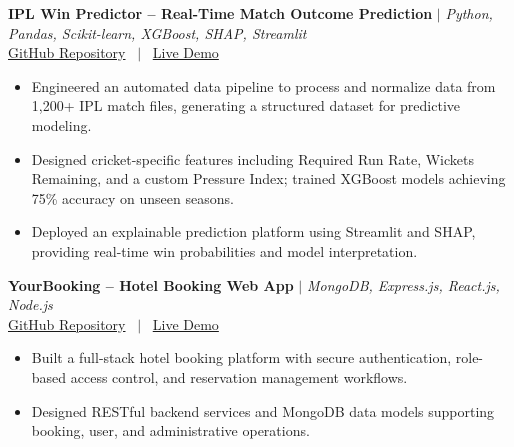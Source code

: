 \documentclass[10pt, a4paper]{article}
\begin{document}
\textbf{IPL Win Predictor -- Real-Time Match Outcome Prediction} $|$ \textit{Python, Pandas, Scikit-learn, XGBoost, SHAP, Streamlit} \\

\small{
\href{https://github.com}{GitHub Repository}
 \ $|$ \ \href{https://demo.example.com}{Live Demo}
} \\

\begin{itemize}

    \item Engineered an automated data pipeline to process and normalize data from 1,200+ IPL match files, generating a structured dataset for predictive modeling.

    \item Designed cricket-specific features including Required Run Rate, Wickets Remaining, and a custom Pressure Index; trained XGBoost models achieving 75\% accuracy on unseen seasons.

    \item Deployed an explainable prediction platform using Streamlit and SHAP, providing real-time win probabilities and model interpretation.

\end{itemize}
\vspace{2pt}

\textbf{YourBooking -- Hotel Booking Web App} $|$ \textit{MongoDB, Express.js, React.js, Node.js} \\

\small{
\href{https://github.com}{GitHub Repository}
 \ $|$ \ \href{https://demo.example.com}{Live Demo}
} \\

\begin{itemize}

    \item Built a full-stack hotel booking platform with secure authentication, role-based access control, and reservation management workflows.

    \item Designed RESTful backend services and MongoDB data models supporting booking, user, and administrative operations.

\end{itemize}
\vspace{2pt}


\end{document}
